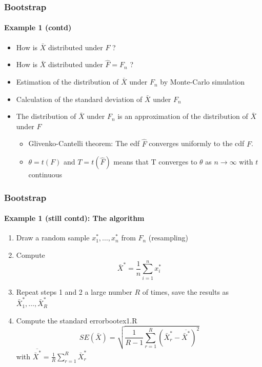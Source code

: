 \documentclass[smaller,compress]{beamer}
\begin{document}
\begin{frame}\frametitle{Bootstrap}\framesubtitle{Example 1 (contd)}
\begin{itemize}
    \item How is $\bar{X}$ distributed under $F$ ?
    \item How is $\bar{X}$ distributed under $\hat{F}=F_{n}$ ?
    \item Estimation of the distribution of $\bar{X}$ under $F_{n}$ by Monte-Carlo simulation
    \item Calculation of the standard deviation of $\bar{X}$ under $F_{n}$
    \item The distribution of $\bar{X}$ under $F_{n}$ is an approximation of the distribution of $\bar{X}$ under $F$
    \begin{itemize}
      \item Glivenko-Cantelli theorem: The edf $\hat{F}$ converges uniformly to the cdf $F$.
      \item $\theta=t(F)$ and $T=t(\hat{F})$ means that T converges to $\theta$ as $n\rightarrow \infty$ with $t$ continuous
    \end{itemize}
\end{itemize}
\end{frame}




\begin{frame}\frametitle{Bootstrap}\framesubtitle{Example 1 (still contd): The algorithm}
\begin{enumerate}
    \item Draw a random sample $x_{1}^{\ast },\ldots ,x_{n}^{\ast }$ from $F_{n} $ (resampling)
    \item Compute
    \begin{equation*}
    \bar{X}^{\ast }=\frac{1}{n}\sum_{i=1}^{n}x_{i}^{\ast }
    \end{equation*}
    \item Repeat steps 1 and 2 a large number $R$ of times, save the results as $\bar{X}_{1}^{\ast },\ldots ,\bar{X}_{R}^{\ast }$
    \item Compute the standard error\hfill {\tiny bootex1.R}
    \begin{equation*}
    SE(\bar{X})=\sqrt{\frac{1}{R-1}\sum_{r=1}^{R}\left( \bar{X}_{r}^{\ast }-\overline{\bar{X}^{\ast }}\right) ^{2}}
    \end{equation*}
    with $\overline{\bar{X}^{\ast }} = \frac{1}{R}\sum_{r=1}^{R}\bar{X}_{r}^{\ast }$
\end{enumerate}
\end{frame}
\end{document}
